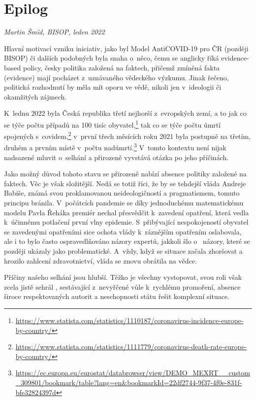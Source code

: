 \chapter{Epilog}

\textit{Martin Šmíd, BISOP, leden 2022}

\vspace{15mm}

\noindent Hlavní motivací vzniku iniciativ, jako byl Model AntiCOVID-19 pro ČR (později BISOP) či dalších podobných byla snaha o~něco, čemu se anglicky říká evidence-based policy, česky politika založená na faktech, přičemž zmíněná fakta (evidence) mají pocházet z~uznávaného vědeckého výzkumu. Jinak řečeno, politická rozhodnutí by měla mít oporu ve vědě, nikoli jen v~ideologii či okamžitých zájmech. 

K~lednu 2022 byla Česká republika třetí nejhorší z~evropských zemí, a to jak co se týče počtu případů na 100 tisíc obyvatel,\footnote{\url{https://www.statista.com/statistics/1110187/coronavirus-incidence-europe-by-country/}} tak co se týče počtu úmrtí spojených s~covidem,\footnote{\url{https://www.statista.com/statistics/1111779/coronavirus-death-rate-europe-by-country/}} v~první třech měsících roku 2021 byla postupně na třetím, druhém a prvním místě v~počtu nadúmrtí.\footnote{\url{https://ec.europa.eu/eurostat/databrowser/view/DEMO_MEXRT__custom_309801/bookmark/table?lang=en&bookmarkId=22df2744-9f37-4f0e-831f-bfe32824397d}} V~tomto kontextu není nijak nadsazené mluvit o~selhání a přirozeně vyvstává otázka po jeho příčinách. 


Jako možný důvod tohoto stavu se přirozeně nabízí absence politiky založené na faktech. Věc je však složitější. Nedá se totiž říci, že by se tehdejší vláda Andreje Babiše, známá svou proklamovanou neideologičností a pragmatismem, tomuto principu bránila. V~počátcích pandemie se díky jednoduchému matematickému modelu Pavla Řeháka premiér nechal přesvědčit k~zavedení opatření, která vedla k~účinnému potlačení první vlny epidemie. S~přibývající nespokojeností obyvatel se zavedenými opatřeními sice ochota vlády k~ráznějším opatřením oslabovala, ale i to bylo často ospravedlňováno názory expertů, jakkoli šlo o~ názory, které se později ukázaly jako problematické. A~vždy, když se situace začala zhoršovat a hrozilo zahlcení zdravotnictví, vláda se znovu obrátila na  vědce.

Příčiny našeho selhání jsou hlubší. Těžko je všechny vystopovat, svou roli však zcela jistě sehrál , sestávající z~nevyřčené vůle k~rychlému promoření, absence široce respektovaných autorit a neschopnosti státu řešit komplexní situace.

